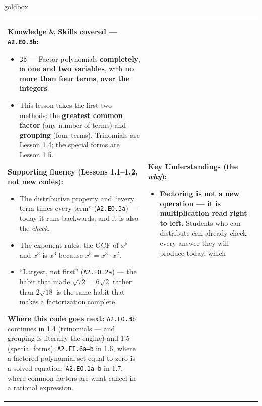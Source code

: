 \documentclass[10pt]{article}
\begin{document}
\renewcommand{\arraystretch}{1.6}
\begin{skillbox}{goldbox}
\begin{tabularx}{\linewidth}{@{}X|X@{}}
\begin{minipage}[t]{\linewidth}\vspace{0pt}
\textbf{Knowledge \& Skills covered --- \texttt{A2.EO.3b}:}
\begin{itemize}[leftmargin=1.1em, itemsep=2pt, topsep=2pt]
  \item \texttt{3b} --- Factor polynomials \textbf{completely}, in \textbf{one and two variables},
        with \textbf{no more than four terms}, \textbf{over the integers}.
  \item This lesson takes the first two methods: the \textbf{greatest common factor} (any number of
        terms) and \textbf{grouping} (four terms). Trinomials are Lesson 1.4; the special forms are
        Lesson 1.5.
\end{itemize}
\textbf{Supporting fluency (Lessons 1.1--1.2, not new codes):}
\begin{itemize}[leftmargin=1.1em, itemsep=2pt, topsep=2pt]
  \item The distributive property and ``every term times every term'' (\texttt{A2.EO.3a}) --- today
        it runs backwards, and it is also the \emph{check}.
  \item The exponent rules: the GCF of $x^5$ and $x^3$ is $x^3$ because $x^5=x^3\cdot x^2$.
  \item ``Largest, not first'' (\texttt{A2.EO.2a}) --- the habit that made $\sqrt{72}=6\sqrt2$
        rather than $2\sqrt{18}$ is the same habit that makes a factorization complete.
\end{itemize}
\textbf{Where this code goes next:} \texttt{A2.EO.3b} continues in 1.4 (trinomials --- and grouping
is literally the engine) and 1.5 (special forms); \texttt{A2.EI.6a--b} in 1.6, where a factored
polynomial set equal to zero is a solved equation; \texttt{A2.EO.1a--b} in 1.7, where common
factors are what cancel in a rational expression.
\end{minipage}
&
\begin{minipage}[t]{\linewidth}\vspace{0pt}
\textbf{Key Understandings (the \emph{why}):}
\begin{itemize}[leftmargin=1.1em, itemsep=2pt, topsep=2pt]
  \item \textbf{Factoring is not a new operation --- it is multiplication read right to left.}
        Students who can distribute can already check every answer they will produce today, which

\end{itemize}
\end{minipage}
\end{tabularx}
\end{skillbox}
\end{document}
